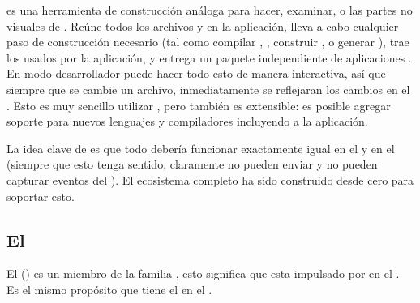 \begin{itemize}
		\commandLinemeteor es una herramienta de construcción análoga para hacer, examinar, o las partes no visuales de \visualstudio. Reúne todos los archivos y \assetsAS en la aplicación, lleva a cabo cualquier paso de construcción necesario (tal como compilar \coffeescript, \minifying \cssNAME, construir \modulesAS \npm, o generar \sourcemaps), trae los \packagesAS usados por la aplicación, y entrega un paquete independiente de aplicaciones \readytorun. En modo desarrollador puede hacer todo esto de manera interactiva, así que siempre que se cambie un archivo, inmediatamente se reflejaran los cambios en el \browserINT. Esto es muy sencillo utilizar \outofthebox, pero también es extensible: es posible agregar soporte para nuevos lenguajes y compiladores incluyendo \buildPL \plugin \packagesAS a la aplicación.

\end{itemize}

La idea clave de \meteorNAME \packageAS \system es que todo debería funcionar exactamente igual en el \browserINT y en el \serverAS (siempre que esto tenga sentido, claramente \browsersINT no pueden enviar \emails y \serversAS no pueden capturar eventos del \mouse). El ecosistema completo ha sido construido desde cero para soportar esto.

\subsection{El \stackAS \meteorNAME}


El \stackAS \meteorNAME() es un miembro de la familia \meanstackNAME, esto significa que esta impulsado por \nodejsNAME en el \serverSideAS. Es el mismo propósito que tiene el \webserverINT \apacheNAME en el \stackAS \lampNAME.




